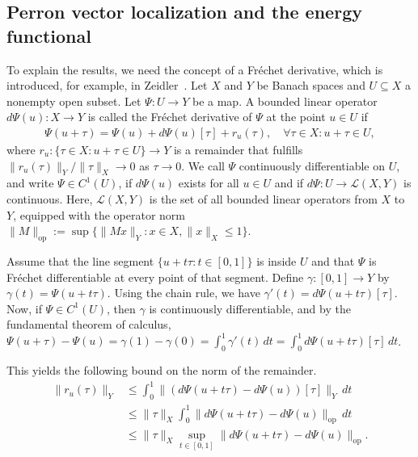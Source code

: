 \subsection{Perron vector localization and the energy functional}\label{sec:perron_vector_concentrates}

To explain the results, we need the concept of a Fréchet derivative, which is introduced, for example, in Zeidler~\cite[Section~4.2]{zeidler_applied_1995}. Let $X$ and $Y$ be Banach spaces and $U\subseteq X$ a nonempty open subset. Let $\Psi:U\to Y$ be a map. A bounded linear operator $d\Psi(u):X\to Y$ is called the Fréchet derivative of $\Psi$ at the point $u\in U$ if
\begin{align*}
    \Psi(u+\tau)=\Psi(u)+d\Psi(u)[\tau]+r_u(\tau),\quad\forall\tau\in X:u+\tau\in U,
\end{align*}
where $r_u:\{\tau\in X:u+\tau\in U\}\to Y$ is a remainder that fulfills $\|r_u(\tau)\|_Y/\|\tau\|_X\to0$ as $\tau\to0$. We call $\Psi$ continuously differentiable on $U$, and write $\Psi\in C^1(U)$, if $d\Psi(u)$ exists for all $u\in U$ and if $d\Psi:U\to\mathcal{L}(X,Y)$ is continuous. Here, $\mathcal{L}(X,Y)$ is the set of all bounded linear operators from $X$ to $Y$, equipped with the operator norm $\|M\|_{\operatorname{op}}:=\sup\{\|Mx\|_{Y}:x\in X,\|x\|_X\le1\}$.

Assume that the line segment $\{u+t\tau:t\in[0,1]\}$ is inside $U$ and that $\Psi$ is Fréchet differentiable at every point of that segment. Define $\gamma:[0,1]\to Y$ by $\gamma(t)=\Psi(u+t\tau)$. Using the chain rule, we have $\gamma'(t)=d\Psi(u+t\tau)[\tau]$. Now, if $\Psi\in C^{1}(U)$, then $\gamma$ is continuously differentiable, and by the fundamental theorem of calculus, $\Psi(u+\tau)-\Psi(u)=\gamma(1)-\gamma(0)=\int_0^1\gamma'(t)\,dt=\int_0^1d\Psi(u+t\tau)[\tau]\,dt$. 

This yields the following bound on the norm of the remainder.
\begin{equation}\label{eq:frechet_remainder_bound}
    \begin{aligned}
        \|r_u(\tau)\|_Y&\le\int_0^1\|(d\Psi(u+t\tau)-d\Psi(u))[\tau]\|_Y\,dt\\&
        \le\|\tau\|_X\int_0^1\|d\Psi(u+t\tau)-d\Psi(u)\|_{\operatorname{op}}\,dt\\&
        \le\|\tau\|_X\sup_{t\in[0,1]}\|d\Psi(u+t\tau)-d\Psi(u)\|_{\operatorname{op}}.
    \end{aligned}
\end{equation}

